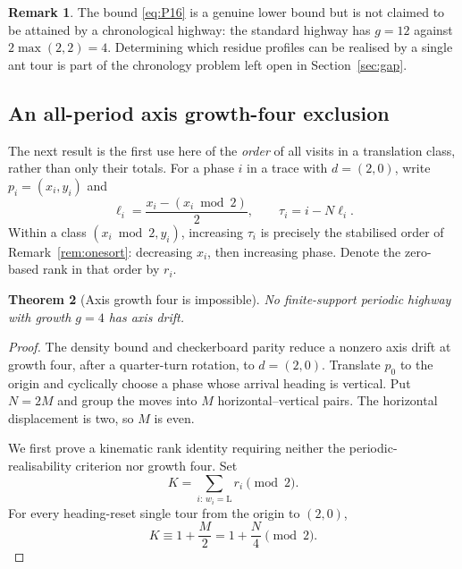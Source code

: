 \documentclass[11pt,letterpaper]{article}
\theoremstyle{plain}
\newtheorem{theorem}{Theorem}[section]
\theoremstyle{definition}
\newtheorem{remark}[theorem]{Remark}
\newcommand{\drift}{d}
\newcommand{\growth}{g}
\newcommand{\turnL}{\mathrm{L}}
\begin{document}
\begin{NoHyper}
\begin{remark}
The bound \eqref{eq:P16} is a genuine lower bound but is not claimed to be attained by
a chronological highway: the standard highway has $\growth=12$ against
$2\max(2,2)=4$. Determining which residue profiles can be realised by a single ant
tour is part of the chronology problem left open in Section~\ref{sec:gap}.
\end{remark}

\subsection{An all-period axis growth-four exclusion}

The next result is the first use here of the \emph{order} of all visits in a
translation class, rather than only their totals.  For a phase $i$ in a trace with
$\drift=(2,0)$, write $p_i=(x_i,y_i)$ and
\[
\ell_i=\frac{x_i-(x_i\bmod2)}2,
\qquad \tau_i=i-N\ell_i.
\]
Within a class $(x_i\bmod2,y_i)$, increasing $\tau_i$ is precisely the stabilised
order of Remark~\ref{rem:onesort}: decreasing $x_i$, then increasing phase.  Denote
the zero-based rank in that order by $r_i$.

\begin{theorem}[Axis growth four is impossible]\label{thm:axisg4}
No finite-support periodic highway with growth $\growth=4$ has axis drift.
\end{theorem}

\begin{proof}
The density bound and checkerboard parity reduce a nonzero axis drift at growth four,
after a quarter-turn rotation, to $\drift=(2,0)$.  Translate $p_0$ to the origin and
cyclically choose a phase whose arrival heading is vertical.  Put $N=2M$ and group
the moves into $M$ horizontal--vertical pairs.  The horizontal displacement is two,
so $M$ is even.

We first prove a kinematic rank identity requiring neither the
periodic-realisability criterion nor growth four.  Set
\begin{equation}\label{eq:rankK}
K=\sum_{i:\,w_i=\turnL}r_i\pmod2.
\end{equation}
For every heading-reset single tour from the origin to $(2,0)$,
\begin{equation}\label{eq:rankparity}
K\equiv 1+\frac M2=1+\frac N4\pmod2.
\end{equation}


\end{proof}
\end{NoHyper}
\end{document}
